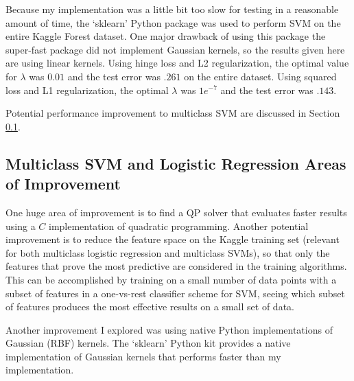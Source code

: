 \documentclass[10pt]{article}
\begin{document}
Because my implementation was a little bit too slow for testing in a reasonable amount of time, the `sklearn' Python package was used to perform SVM on the entire Kaggle Forest dataset. One major drawback of using this package the super-fast package did not implement Gaussian kernels, so the results given here are using linear kernels. Using hinge loss and L2 regularization, the optimal value for $\lambda$ was $0.01$ and the test error was $.261$ on the entire dataset. Using squared loss and L1 regularization, the optimal $\lambda$ was $1e^{-7}$ and the test error was $.143$. 

Potential performance improvement to multiclass SVM are discussed in Section \ref{sec:improvement}.

\subsection{Multiclass SVM and Logistic Regression Areas of Improvement}
\label{sec:improvement}

One huge area of improvement is to find a QP solver that evaluates faster results using a $C$ implementation of quadratic programming. Another potential improvement is to reduce the feature space on the Kaggle training set (relevant for both multiclass logistic regression and multiclass SVMs), so that only the features that prove the most predictive are considered in the training algorithms. This can be accomplished by training on a small number of data points with a subset of features in a one-vs-rest classifier scheme for SVM, seeing which subset of features produces the most effective results on a small set of data.

Another improvement I explored was using native Python implementations of Gaussian (RBF) kernels. The `sklearn' Python kit provides a native implementation of Gaussian kernels that performs faster than my implementation.
\end{document}
